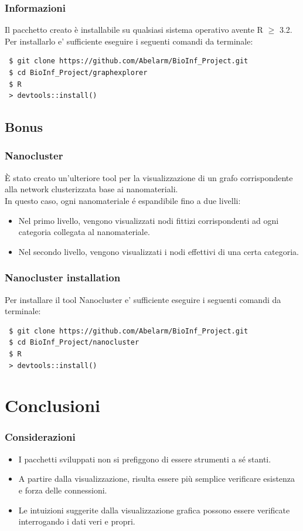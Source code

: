 \documentclass{beamer}
\begin{document}
\begin{frame}[fragile]
\frametitle{Informazioni}
Il pacchetto creato è installabile su qualsiasi sistema operativo avente R $\geq$ 3.2.
Per installarlo e' sufficiente eseguire i seguenti comandi da terminale:
\begin{footnotesize}
\begin{lstlisting}
 $ git clone https://github.com/Abelarm/BioInf_Project.git
 $ cd BioInf_Project/graphexplorer
 $ R
 > devtools::install()
\end{lstlisting}
\end{footnotesize}
\end{frame}


\subsection{Bonus}
\begin{frame}
\frametitle{Nanocluster}
È stato creato un'ulteriore tool per la visualizzazione di un grafo corrispondente alla network clusterizzata base ai nanomateriali.\\
\medskip
In questo caso, ogni nanomateriale \'e espandibile fino a due livelli:
\begin{itemize}
	\item Nel primo livello, vengono visualizzati nodi fittizi corrispondenti ad ogni categoria collegata al nanomateriale. 
	\item Nel secondo livello, vengono visualizzati i nodi effettivi di una certa categoria.
\end{itemize}
\end{frame}

\begin{frame}[fragile]
\frametitle{Nanocluster installation}
Per installare il tool Nanocluster e' sufficiente eseguire i seguenti comandi da terminale:
\begin{footnotesize}
\begin{lstlisting}
 $ git clone https://github.com/Abelarm/BioInf_Project.git
 $ cd BioInf_Project/nanocluster
 $ R
 > devtools::install()
\end{lstlisting}
\end{footnotesize}
\end{frame}

\section{Conclusioni}

\begin{frame}
\frametitle{Considerazioni}
\begin{itemize}
\item I pacchetti sviluppati non si prefiggono di essere strumenti a sé stanti.
\item A partire dalla visualizzazione, risulta essere più semplice verificare esistenza e forza delle connessioni.
\item Le intuizioni suggerite dalla visualizzazione grafica possono essere verificate interrogando i dati veri e propri.
\end{itemize}
\end{frame}
\end{document}
